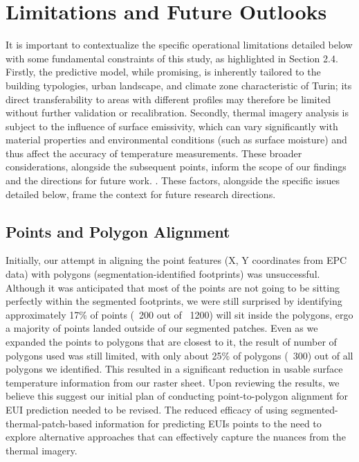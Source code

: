 \documentclass[preprint,12pt]{elsarticle}
\begin{document}
\section{Limitations and Future Outlooks}
    It is important to contextualize the specific operational limitations detailed below with some fundamental constraints of this study, as highlighted in Section 2.4. Firstly, the predictive model, while promising, is inherently tailored to the building typologies, urban landscape, and climate zone characteristic of Turin; its direct transferability to areas with different profiles may therefore be limited without further validation or recalibration. Secondly, thermal imagery analysis is subject to the influence of surface emissivity, which can vary significantly with material properties and environmental conditions (such as surface moisture) and thus affect the accuracy of temperature measurements. These broader considerations, alongside the subsequent points, inform the scope of our findings and the directions for future work.
. These factors, alongside the specific issues detailed below, frame the context for future research directions.
    \subsection{Points and Polygon Alignment}%
    Initially, our attempt in aligning the point features (X, Y coordinates from EPC data) with polygons (segmentation-identified footprints) was unsuccessful. Although it was anticipated that most of the points are not going to be sitting perfectly within the segmented footprints, we were still surprised by identifying approximately 17\% of points (~200 out of ~1200) will sit inside the polygons, ergo a majority of points landed outside of our segmented patches. Even as we expanded the points to polygons that are closest to it, the result of number of polygons used was still limited, with only about 25\% of polygons (~300) out of all polygons we identified. This resulted in a significant reduction in usable surface temperature information from our raster sheet. Upon reviewing the results, we believe this suggest our initial plan of conducting point-to-polygon alignment for EUI prediction needed to be revised. The reduced efficacy of using segmented-thermal-patch-based information for predicting EUIs points to the need to explore alternative approaches that can effectively capture the nuances from the thermal imagery. 
\end{document}
